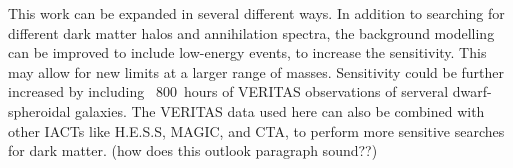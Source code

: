 This work can be expanded in several different ways.
In addition to searching for different dark matter halos and annihilation spectra, the background modelling can be improved to include low-energy events, to increase the sensitivity.
This may allow for new limits at a larger range of masses.
Sensitivity could be further increased by including ~\SI{800}{hours} of VERITAS observations of serveral dwarf-spheroidal galaxies.
The VERITAS data used here can also be combined with other IACTs like H.E.S.S, MAGIC, and CTA, to perform more sensitive searches for dark matter.
{\color{red}(how does this outlook paragraph sound??)}

